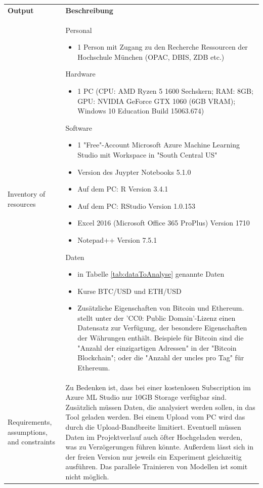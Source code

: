 \begin{longtable}[H]{|p{}|p{10cm}|}
\hline
\textbf{Output} & \textbf{Beschreibung} \\ 
\hhline{==}
Inventory of resources & Personal
\begin{itemize}
\item 1 Person mit Zugang zu den Recherche Ressourcen der Hochschule München (OPAC, DBIS, ZDB etc.\citep{noauthor_hochschule_2017})
\end{itemize}
Hardware
\begin{itemize}
\item 1 PC (CPU: AMD Ryzen 5 1600 Sechskern; RAM: 8GB; GPU: NVIDIA GeForce GTX 1060 (6GB VRAM); Windows 10 Education Build 15063.674)
\end{itemize}
Software
\begin{itemize}
\item 1 "Free"-Account Microsoft Azure Machine Learning Studio mit Workspace in "South Central US"
\item Version des Juypter Notebooks 5.1.0
\item Auf dem PC: R Version 3.4.1
\item Auf dem PC: RStudio Version 1.0.153
\item Excel 2016 (Microsoft Office 365 ProPlus) Version 1710
\item Notepad++ Version 7.5.1
\end{itemize}
Daten
\begin{itemize}
\item in Tabelle \ref{tab:dataToAnalyse} genannte Daten
\item Kurse BTC/USD und ETH/USD
\item Zusätzliche Eigenschaften von Bitcoin und Ethereum. \citep{srk_cryptocurrency_2017} stellt unter der 'CC0: Public Domain'-Lizenz einen Datensatz zur Verfügung, der besondere Eigenschaften der Währungen enthält. Beispiele für Bitcoin sind die "Anzahl der einzigartigen Adressen" in der "Bitcoin Blockchain"; oder die "Anzahl der uncles pro Tag"\citep[eigene Übersetzung]{srk_cryptocurrency_2017} für Ethereum.
\end{itemize}
\\
\hline
Requirements, assumptions, and constraints & Zu Bedenken ist, dass bei einer kostenlosen Subscription im Azure ML Studio nur 10GB Storage verfügbar sind. Zusätzlich müssen Daten, die analysiert werden sollen, in das Tool geladen werden. Bei einem Upload vom PC wird das durch die Upload-Bandbreite limitiert. Eventuell müssen Daten im Projektverlauf auch öfter Hochgeladen werden, was zu Verzögerungen führen könnte. Außerdem lässt sich in der freien Version nur jeweils ein Experiment gleichzeitig ausführen. Das parallele Trainieren von Modellen ist somit nicht möglich.\newline 

\end{longtable}

